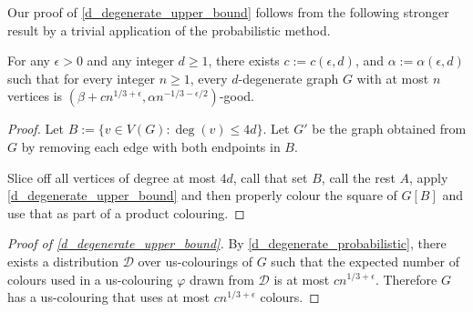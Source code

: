 \documentclass[kpfonts]{patmorin}
\begin{document}
Our proof of \cref{d_degenerate_upper_bound} follows from the following stronger result by a trivial application of the probabilistic method.

\begin{lem}\label{d_degenerate_probabilistic}
  For any $\epsilon >0$ and any integer $d\ge 1$, there exists $c:=c(\epsilon,d)$, and $\alpha:=\alpha(\epsilon,d)$ such that for every integer $n\ge 1$, every $d$-degenerate graph $G$ with at most $n$ vertices is $(\beta+cn^{1/3+\epsilon},\alpha n^{-1/3-\epsilon/2})$-good.
\end{lem}


\begin{proof}
  Let $B:=\{v\in V(G):\deg(v)\le 4d\}$. Let $G'$ be the graph obtained from $G$ by removing each edge with both endpoints in $B$.


  Slice off all vertices of degree at most $4d$, call that set $B$, call the rest $A$, apply \cref{d_degenerate_upper_bound} and then properly colour the square of $G[B]$ and use that as part of a product colouring.
\end{proof}


\begin{proof}[Proof of \cref{d_degenerate_upper_bound}]
  By \cref{d_degenerate_probabilistic}, there exists a distribution $\mathcal{D}$ over us-colourings of $G$ such that the expected number of colours used in a us-colouring $\varphi$ drawn from $\mathcal{D}$ is at most $cn^{1/3+\epsilon}$.  Therefore $G$ has a us-colouring that uses at most $cn^{1/3+\epsilon}$ colours.
\end{proof}






\end{document}
